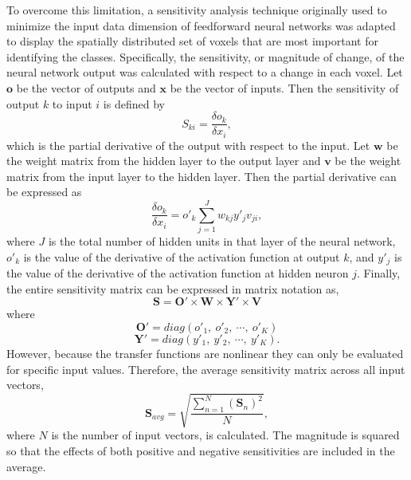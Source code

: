 \documentclass[5p,authoryear]{elsarticle}
\begin{document}
To overcome this limitation, a sensitivity analysis technique originally used to minimize the input data dimension of feedforward neural networks \citep{Zurada1994} was adapted to display the spatially distributed set of voxels that are most important for identifying the classes.
Specifically, the sensitivity, or magnitude of change, of the neural network output was calculated with respect to a change in each voxel.
Let $\mathbf{o}$ be the vector of outputs and $\mathbf{x}$ be the vector of inputs.
Then the sensitivity of output $k$ to input $i$ is defined by
\begin{equation}
S_{ki} = \frac{\delta o_{k}}{\delta x_{i}},
\end{equation}
which is the partial derivative of the output with respect to the input.
Let $\mathbf{w}$ be the weight matrix from the hidden layer to the output layer and $\mathbf{v}$ be the weight matrix from the input layer to the hidden layer.
Then the partial derivative can be expressed as
\begin{equation}
\frac{\delta o_{k}}{\delta x_{i}} = o'_{k} \sum^{J}_{j=1}{w_{kj}y'_{j}v_{ji}},
\end{equation}
where $J$ is the total number of hidden units in that layer of the neural network,  $o'_{k}$ is the value of the derivative of the activation function at output $k$, and $y'_{j}$ is the value of the derivative of the activation function at hidden neuron $j$.
Finally, the entire sensitivity matrix can be expressed in matrix notation as,
\begin{equation}
\mathbf{S} = \mathbf{O}' \times \mathbf{W} \times \mathbf{Y}' \times \mathbf{V}
\end{equation}
where
\begin{equation}
\mathbf{O}' = diag(o'_{1},~o'_{2},~\cdots,~o'_{K})
\end{equation}
\begin{equation}
\mathbf{Y}' = diag(y'_{1},~y'_{2},~\cdots,~y'_{K}).
\end{equation}
However, because the transfer functions are nonlinear they can only be evaluated for specific input values.
Therefore, the average sensitivity matrix across all input vectors,
\begin{equation}
\mathbf{S}_{avg} = \sqrt{ \frac{ \sum_{n = 1}^{N}{ \left( \mathbf{S}_{n}\right)^{2} } }{N} },
\label{eqn:sensitivity}
\end{equation}
where $N$ is the number of input vectors, is calculated.
The magnitude is squared so that the effects of both positive and negative sensitivities are included in the average.
\end{document}
